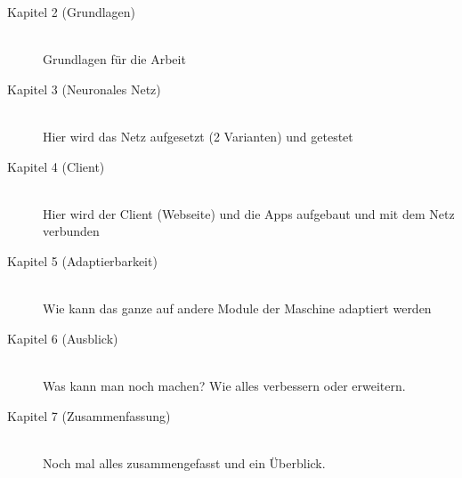 \begin{description}

    \item[Kapitel 2 (Grundlagen)]\hfill \\
    Grundlagen für die Arbeit

    \item[Kapitel 3 (Neuronales Netz)]\hfill \\
    Hier wird das Netz aufgesetzt (2 Varianten) und getestet

    \item[Kapitel 4 (Client)]\hfill \\
    Hier wird der Client (Webseite) und die Apps aufgebaut und mit dem Netz verbunden

    \item[Kapitel 5 (Adaptierbarkeit)]\hfill \\
    Wie kann das ganze auf andere Module der Maschine adaptiert werden

    \item[Kapitel 6 (Ausblick)]\hfill \\
    Was kann man noch machen? Wie alles verbessern oder erweitern.

    \item[Kapitel 7 (Zusammenfassung)]\hfill \\
    Noch mal alles zusammengefasst und ein Überblick.

\end{description}